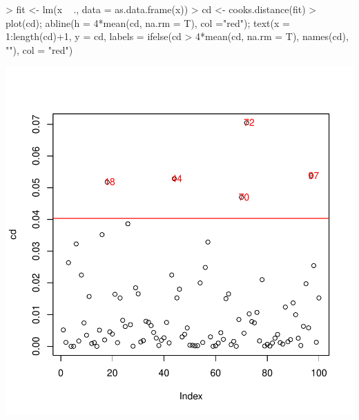 \documentclass{article}
\begin{document}
\begin{Schunk}
\begin{Sinput}
> fit <- lm(x ~ ., data = as.data.frame(x))
> cd <- cooks.distance(fit)
> plot(cd); abline(h = 4*mean(cd, na.rm = T), col ="red"); text(x = 1:length(cd)+1, y = cd, labels = ifelse(cd > 4*mean(cd, na.rm = T), names(cd), ""), col = "red")
\end{Sinput}
\end{Schunk}
\includegraphics{outliers-005}
\end{document}
